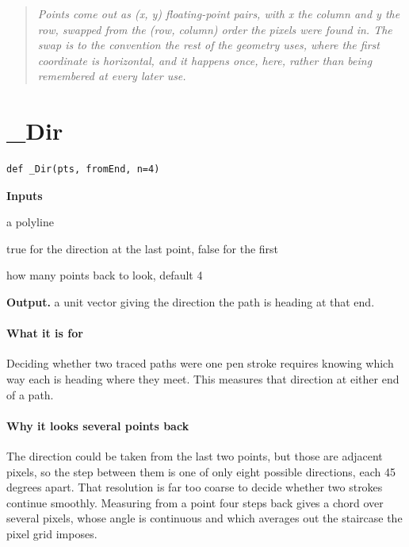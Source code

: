 \begin{quote}\small\itshape Points come out as (x, y) floating-point pairs, with x the column and y the row, swapped from the (row, column) order the pixels were found in. The swap is to the convention the rest of the geometry uses, where the first coordinate is horizontal, and it happens once, here, rather than being remembered at every later use.\end{quote}

\section{\_Dir}
\begin{lstlisting}[style=sig]
def _Dir(pts, fromEnd, n=4)
\end{lstlisting}

\noindent\textbf{Inputs}
\begin{description}[leftmargin=2.2em,style=nextline,font=\normalfont\ttfamily]\setlength\itemsep{1pt}
  \item[{pts}] \normalfont a polyline
  \item[{fromEnd}] \normalfont true for the direction at the last point, false for the first
  \item[{n}] \normalfont how many points back to look, default 4
\end{description}

\noindent\textbf{Output.} a unit vector giving the direction the path is heading at that end.


\paragraph{What it is for}
Deciding whether two traced paths were one pen stroke requires knowing which way each is heading where they meet. This measures that direction at either end of a path.


\paragraph{Why it looks several points back}
The direction could be taken from the last two points, but those are adjacent pixels, so the step between them is one of only eight possible directions, each 45 degrees apart. That resolution is far too coarse to decide whether two strokes continue smoothly. Measuring from a point four steps back gives a chord over several pixels, whose angle is continuous and which averages out the staircase the pixel grid imposes.


